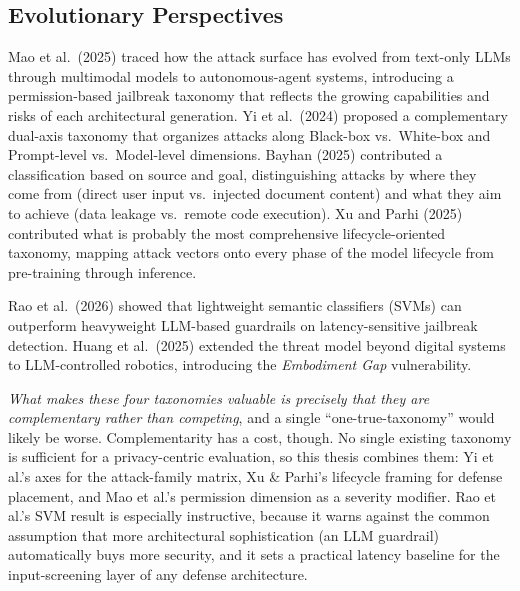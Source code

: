 \documentclass[12pt, a4paper]{article}
\begin{document}
\subsection{Evolutionary Perspectives}

Mao et al.\ (2025) traced how the attack surface has evolved from text-only LLMs through multimodal models to autonomous-agent systems, introducing a permission-based jailbreak taxonomy that reflects the growing capabilities and risks of each architectural generation. Yi et al.\ (2024) proposed a complementary dual-axis taxonomy that organizes attacks along Black-box vs.\ White-box and Prompt-level vs.\ Model-level dimensions. Bayhan (2025) contributed a classification based on source and goal, distinguishing attacks by where they come from (direct user input vs.\ injected document content) and what they aim to achieve (data leakage vs.\ remote code execution). Xu and Parhi (2025) contributed what is probably the most comprehensive lifecycle-oriented taxonomy, mapping attack vectors onto every phase of the model lifecycle from pre-training through inference.

Rao et al.\ (2026) showed that lightweight semantic classifiers (SVMs) can outperform heavyweight LLM-based guardrails on latency-sensitive jailbreak detection. Huang et al.\ (2025) extended the threat model beyond digital systems to LLM-controlled robotics, introducing the \emph{Embodiment Gap} vulnerability.

\begin{critbox}
\textit{What makes these four taxonomies valuable is precisely that they are complementary rather than competing}, and a single ``one-true-taxonomy'' would likely be worse. Complementarity has a cost, though. No single existing taxonomy is sufficient for a privacy-centric evaluation, so this thesis combines them: Yi et al.'s axes for the attack-family matrix, Xu \& Parhi's lifecycle framing for defense placement, and Mao et al.'s permission dimension as a severity modifier. Rao et al.'s SVM result is especially instructive, because it warns against the common assumption that more architectural sophistication (an LLM guardrail) automatically buys more security, and it sets a practical latency baseline for the input-screening layer of any defense architecture.
\end{critbox}
\end{document}
